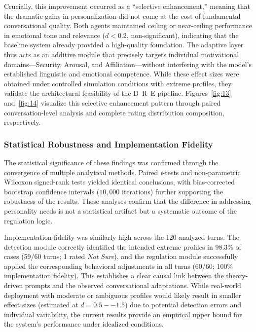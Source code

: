 Crucially, this improvement occurred as a ``selective enhancement,'' meaning that the dramatic gains in personalization did not come at the cost of fundamental conversational quality. Both agents maintained ceiling or near-ceiling performance in emotional tone and relevance (\(d < 0.2\), non-significant), indicating that the baseline system already provided a high-quality foundation. The adaptive layer thus acts as an additive module that precisely targets individual motivational domains---Security, Arousal, and Affiliation---without interfering with the model's established linguistic and emotional competence. While these effect sizes were obtained under controlled simulation conditions with extreme profiles, they validate the architectural feasibility of the D--R--E pipeline. Figures~\ref{fig:13} and~\ref{fig:14} visualize this selective enhancement pattern through paired conversation-level analysis and complete rating distribution composition, respectively.





\subsubsection{Statistical Robustness and Implementation Fidelity}\label{statistical-robustness-and-implementation-fidelity}

The statistical significance of these findings was confirmed through the convergence of multiple analytical methods. Paired \textit{t}-tests and non-parametric Wilcoxon signed-rank tests yielded identical conclusions, with bias-corrected bootstrap confidence intervals (\(10,000\) iterations) further supporting the robustness of the results. These analyses confirm that the difference in addressing personality needs is not a statistical artifact but a systematic outcome of the regulation logic.

Implementation fidelity was similarly high across the 120 analyzed turns. The detection module correctly identified the intended extreme profiles in 98.3\% of cases (59/60 turns; 1 rated \emph{Not Sure}), and the regulation module successfully applied the corresponding behavioral adjustments in all turns (60/60; 100\% implementation fidelity). This establishes a clear causal link between the theory-driven prompts and the observed conversational adaptations. While real-world deployment with moderate or ambiguous profiles would likely result in smaller effect sizes (estimated at \(d = 0.5--1.5\)) due to potential detection errors and individual variability, the current results provide an empirical upper bound for the system's performance under idealized conditions.

